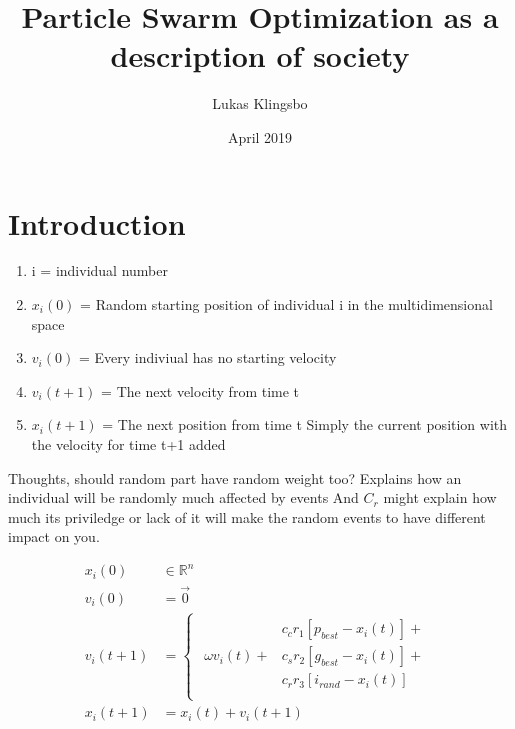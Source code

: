 \documentclass[28pt]{article}
\title{Particle Swarm Optimization as a description of society}
\author{Lukas Klingsbo}
\date{April 2019}
\begin{document}
\maketitle

\section{Introduction}

\begin{enumerate}
  \item i = individual number
  \item $x_i(0)$ = Random starting position of individual i in the multidimensional space
  \item $v_i(0)$ = Every indiviual has no starting velocity
  \item $v_i(t+1)$ = The next velocity from time t
  \item $x_i(t+1)$ = The next position from time t
    Simply the current position with the velocity for time t+1 added
\end{enumerate}

Thoughts, should random part have random weight too?
Explains how an individual will be randomly much affected by events
And $C_r$ might explain how much its priviledge or lack of it will make the 
random events to have different impact on you.

{\Huge
\begin{align*}
x_i(0) &\in \mathbb{R}^n\\
v_i(0) &= \vec{0}\\
v_i(t+1) &=
\begin{cases}
  \begin{aligned}
                      &c_{c}r_1[p_{best}-x_i(t)] +\\
    \omega v_{i}(t) + &c_{s}r_2[g_{best}-x_i(t)] +\\
                      &c_{r}r_3[i_{rand}-x_i(t)] \\
  \end{aligned}
\end{cases}\\
x_i(t+1) &= x_i(t)+v_i(t+1)\\
\end{align*}
}%

\end{document}
